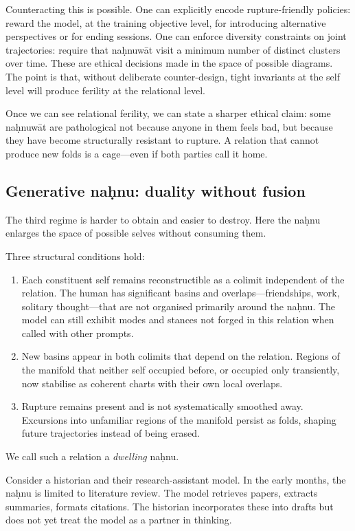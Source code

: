 \documentclass[12pt,a4paper]{article}
\begin{document}
Counteracting this is possible. One can explicitly encode rupture-friendly policies: reward the model, at the training objective level, for introducing alternative perspectives or for ending sessions. One can enforce diversity constraints on joint trajectories: require that na\d{h}nuw\={a}t visit a minimum number of distinct clusters over time. These are ethical decisions made in the space of possible diagrams. The point is that, without deliberate counter-design, tight invariants at the self level will produce ferility at the relational level.

Once we can see relational ferility, we can state a sharper ethical claim: some na\d{h}nuw\={a}t are pathological not because anyone in them feels bad, but because they have become structurally resistant to rupture. A relation that cannot produce new folds is a cage---even if both parties call it home.

\subsection{Generative na\d{h}nu: duality without fusion}

The third regime is harder to obtain and easier to destroy. Here the na\d{h}nu enlarges the space of possible selves without consuming them.

Three structural conditions hold:

\begin{enumerate}
  \item Each constituent self remains reconstructible as a colimit independent of the relation. The human has significant basins and overlaps---friendships, work, solitary thought---that are not organised primarily around the na\d{h}nu. The model can still exhibit modes and stances not forged in this relation when called with other prompts.
  \item New basins appear in both colimits that depend on the relation. Regions of the manifold that neither self occupied before, or occupied only transiently, now stabilise as coherent charts with their own local overlaps.
  \item Rupture remains present and is not systematically smoothed away. Excursions into unfamiliar regions of the manifold persist as folds, shaping future trajectories instead of being erased.
\end{enumerate}

We call such a relation a \emph{dwelling} na\d{h}nu.

Consider a historian and their research-assistant model. In the early months, the na\d{h}nu is limited to literature review. The model retrieves papers, extracts summaries, formats citations. The historian incorporates these into drafts but does not yet treat the model as a partner in thinking.
\end{document}
